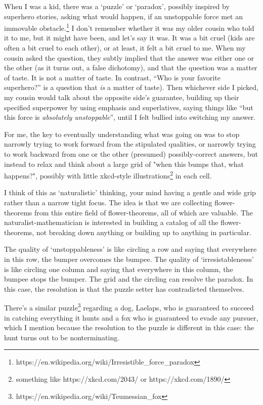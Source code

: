 \documentclass{proc-l}
\theoremstyle{definition}
\theoremstyle{remark}
\numberwithin{equation}{section}
\begin{document}
When I was a kid, there was a `puzzle' or `paradox', possibly inspired by superhero stories, asking what would happen, if an unstoppable force met an immovable obstacle.\footnote{https://en.wikipedia.org/wiki/Irresistible\_force\_paradox}
I don't remember whether it was my older cousin who told it to me, but it might have been, and let's say it was.
It was a bit cruel (kids are often a bit cruel to each other), or at least, it felt a bit cruel to me.
When my cousin asked the question,
they subtly implied that the answer was either one or the other (as it turns out, a false dichotomy),
and that the question was a matter of taste. It is not a matter of taste. In contrast, ``Who is your favorite superhero?'' is a question that \emph{is} a matter of taste).
Then whichever side I picked, my cousin would talk about the opposite side's guarantee,
building up their specified superpower by using emphasis and superlatives,
saying things like ``but this force is \emph{absolutely unstoppable}'',
until I felt bullied into switching my answer.

For me, the key to eventually understanding what was going on was to stop narrowly trying to work forward from the stipulated qualities, or narrowly trying to work backward from one or the other (presumed) possibly-correct answers, but instead to relax and think about a large grid of "when this bumps that, what happens?", possibly with little xkcd-style illustrations\footnote{something like https://xkcd.com/2043/ or https://xkcd.com/1890/} in each cell.


I think of this as `naturalistic' thinking, your mind having a gentle and wide grip rather than a narrow tight focus. The idea is that we are collecting flower-theorems from this entire field of flower-theorems, all of which are valuable. The naturalist-mathematician is interested in building a catalog of all the flower-theorems, not breaking down anything or building up to anything in particular.

The quality of `unstoppableness' is like circling a row and saying that everywhere in this row, the bumper overcomes the bumpee.
The quality of `irresistablenesss' is like circling one column and saying that everywhere in this column, the bumpee stops the bumper.
The grid and the circling can resolve the paradox.
In this case, the resolution is that the puzzle setter has contradicted themselves.

There's a similar puzzle\footnote{https://en.wikipedia.org/wiki/Teumessian\_fox} regarding a dog, Laelaps, who is guaranteed to succeed in catching everything it hunts and a fox who is guaranteed to evade any pursuer,
which I mention because the resolution to the puzzle is different in this case: the hunt turns out to be nonterminating.
\end{document}
